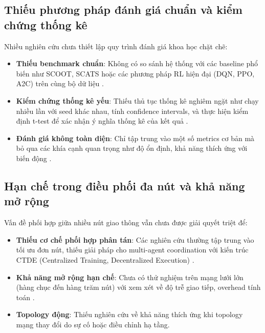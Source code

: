\subsection{Thiếu phương pháp đánh giá chuẩn và kiểm chứng thống kê}

Nhiều nghiên cứu chưa thiết lập quy trình đánh giá khoa học chặt chẽ:

\begin{itemize}
    \item \textbf{Thiếu benchmark chuẩn}: Không có so sánh hệ thống với các baseline phổ biến như SCOOT, SCATS hoặc các phương pháp RL hiện đại (DQN, PPO, A2C) trên cùng bộ dữ liệu \cite{Hunt1981, Lowrie1990}.
    
    \item \textbf{Kiểm chứng thống kê yếu}: Thiếu thủ tục thống kê nghiêm ngặt như chạy nhiều lần với seed khác nhau, tính confidence intervals, và thực hiện kiểm định t-test để xác nhận ý nghĩa thống kê của kết quả \cite{Shaikh2022}.
    
    \item \textbf{Đánh giá không toàn diện}: Chỉ tập trung vào một số metrics cơ bản mà bỏ qua các khía cạnh quan trọng như độ ổn định, khả năng thích ứng với biến động \cite{Zhao2020}.
\end{itemize}

\subsection{Hạn chế trong điều phối đa nút và khả năng mở rộng}

Vấn đề phối hợp giữa nhiều nút giao thông vẫn chưa được giải quyết triệt để:

\begin{itemize}
    \item \textbf{Thiếu cơ chế phối hợp phân tán}: Các nghiên cứu thường tập trung vào tối ưu đơn nút, thiếu giải pháp cho multi-agent coordination với kiến trúc CTDE (Centralized Training, Decentralized Execution) \cite{Kouvelas2011}.
    
    \item \textbf{Khả năng mở rộng hạn chế}: Chưa có thử nghiệm trên mạng lưới lớn (hàng chục đến hàng trăm nút) với xem xét về độ trễ giao tiếp, overhead tính toán \cite{Zhao2012}.
    
    \item \textbf{Topology động}: Thiếu nghiên cứu về khả năng thích ứng khi topology mạng thay đổi do sự cố hoặc điều chỉnh hạ tầng.
\end{itemize}

